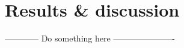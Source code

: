 \section{Results \& discussion}
\label{sec:resul}

------------ Do something here ----------------------

